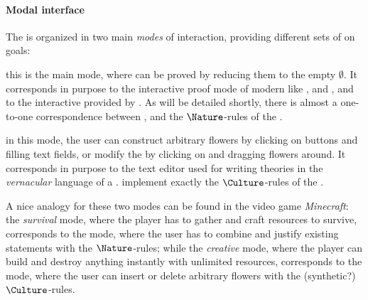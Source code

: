 \begin{scope}
\paragraph{Modal interface}

The  is organized in two main \emph{modes} of interaction,
providing different sets of   on
goals:
\begin{description}
   this is the main mode, where  can be proved by
  reducing them to the empty  $\emptyset$. It corresponds in purpose to
  the interactive proof mode of modern  like ,  and
  , and to the interactive  provided by .
  As will be detailed shortly, there is almost a one-to-one correspondence
  between  , and the $\Nature$-rules of the .
  
   in this mode, the user can construct arbitrary
  flowers by clicking on buttons and filling text fields, or modify the
   by clicking on and dragging flowers around. It corresponds in
  purpose to the text editor used for writing theories in the \emph{vernacular}
  language of a . 
   implement exactly the $\Culture$-rules of the .
\end{description}

\begin{remark}
  A nice analogy for these two modes can be found in the video game
  \emph{Minecraft}: the \emph{survival} mode, where the player has to gather and
  craft resources to survive, corresponds to the  mode, where the user has
  to combine and justify existing statements with the  $\Nature$-rules;
  while the \emph{creative} mode, where the player can build and destroy
  anything instantly with unlimited resources, corresponds to the  mode,
  where the user can insert or delete arbitrary flowers with the (synthetic?)
  $\Culture$-rules.
\end{remark}


\end{scope}
